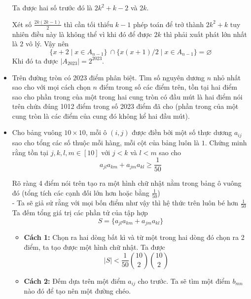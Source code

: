 \documentclass[11pt]{scrartcl}
\begin{document}
\begin{itemize}[label=, leftmargin=0em, itemsep=0.5em]
\begin{sol}
        Ta được hai số trước đó là $2k^2 + k - 2$ và $2k$.


        Xét số $\frac{2k(2k - 1)}{2}$ thì cần tối thiểu $k - 1$ phép toán để trở thành $2k^2 + k$ tuy nhiên điều này là không thể vì khi đó để được $2k$ thì phải xuất phát lớn nhất là $2$ vô lý. Vậy nên 
        \[
            \{ x + 2 \mid x \in A_{n - 1} \} \ \cap \{x(x+1) / 2 \mid x \in A_{n - 1} \} = \varnothing
        \]
        Khi đó ta được $|A_{2023}| = 2^{2023}$.
    \end{sol}

    \item \begin{btvn}
        Trên đường tròn có 2023 điểm phân biệt. Tìm số nguyên dương $n$ nhỏ nhất sao cho với mọi cách chọn $n$ điểm trong số các điểm trên, tồn tại hai điểm sao cho phần trong của một trong hai cung tròn có đầu mút là hai điểm nói trên chứa đúng 1012 điểm trong số 2023 điểm đã cho (phần trong của một cung tròn là các điểm của cung đó không kể hai đầu mút).
    \end{btvn}
    \item \begin{bt}
        Cho bảng vuông $10\times 10$, mỗi ô $(i,j)$ được điền bởi một số thực dương $a_{ij}$ sao cho tổng các số thuộc mỗi hàng, mỗi cột của bảng luôn là $1$. Chứng minh rằng tồn tại $j,k,l,m \in [10]$ với $j < k$ và $l < m$ sao cho
        \[
            a_{jl}a_{km} + a_{jm}a_{kl} \geq \frac{1}{50}
        \]
    \end{bt}
    \begin{sol}
        Rõ ràng 4 điểm nói trên tạo ra một hình chữ nhật nằm trong bảng ô vuông đó (tổng tích các cạnh đối lớn hơn hoặc bằng $\frac{1}{50}$)\\
    - Ta sẽ giả sử rằng với mọi bốn điểm như vậy thì hệ thức trên luôn bé hơn $\frac{1}{50}$\\
    Ta đếm tổng giá trị các phần tử của tập hợp
    $$ S = \{a_{jl}a_{km} + a_{jm}a_{kl} \}$$
    \begin{itemize}[label=,leftmargin=0em]
        \item \textbf{Cách 1:} Chọn ra hai dòng bất kì và từ một trong hai dòng đó chọn ra 2 điểm, ta tạo được một hình chữ nhật. Ta được $$|S| < \frac{1}{50}\binom{10}{2}\binom{10}{2} $$
                    \begin{figure}[ht]
            \centering
        \end{figure}
        \item \textbf{Cách 2:} Đếm dựa trên một điểm $a_{ij}$ cho trước. Ta sẽ tìm một điểm $b_{mn} $ nào đó để tạo nên một đường chéo. 
        

\end{itemize}
\end{sol}
\end{itemize}
\end{document}
